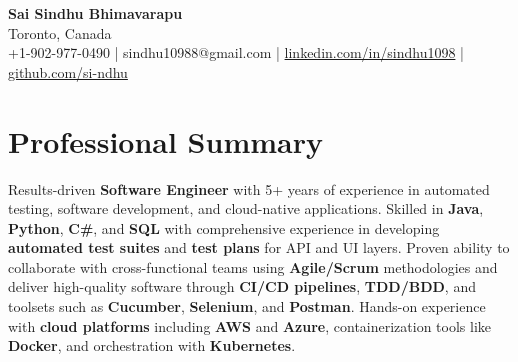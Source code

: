 \documentclass[letterpaper,11pt]{article}
\begin{document}
\begin{center}
  {\Large \textbf{Sai Sindhu Bhimavarapu}} \\
  Toronto, Canada \\
  +1-902-977-0490 \enspace | \enspace sindhu10988@gmail.com \enspace | \enspace \href{https://www.linkedin.com/in/sindhu1098/}{linkedin.com/in/sindhu1098} \enspace | \enspace \href{https://github.com/si-ndhu}{github.com/si-ndhu}
\end{center}

\section{Professional Summary}
  \begin{itemize}[leftmargin=0.15in, label={}]
    \small{\item{
     Results-driven \textbf{Software Engineer} with 5+ years of experience in automated testing, software development, and cloud-native applications. Skilled in \textbf{Java}, \textbf{Python}, \textbf{C\#}, and \textbf{SQL} with comprehensive experience in developing \textbf{automated test suites} and \textbf{test plans} for API and UI layers. Proven ability to collaborate with cross-functional teams using \textbf{Agile/Scrum} methodologies and deliver high-quality software through \textbf{CI/CD pipelines}, \textbf{TDD/BDD}, and toolsets such as \textbf{Cucumber}, \textbf{Selenium}, and \textbf{Postman}. Hands-on experience with \textbf{cloud platforms} including \textbf{AWS} and \textbf{Azure}, containerization tools like \textbf{Docker}, and orchestration with \textbf{Kubernetes}.
    }}
  \end{itemize}
\vspace{-16pt}

\end{document}
